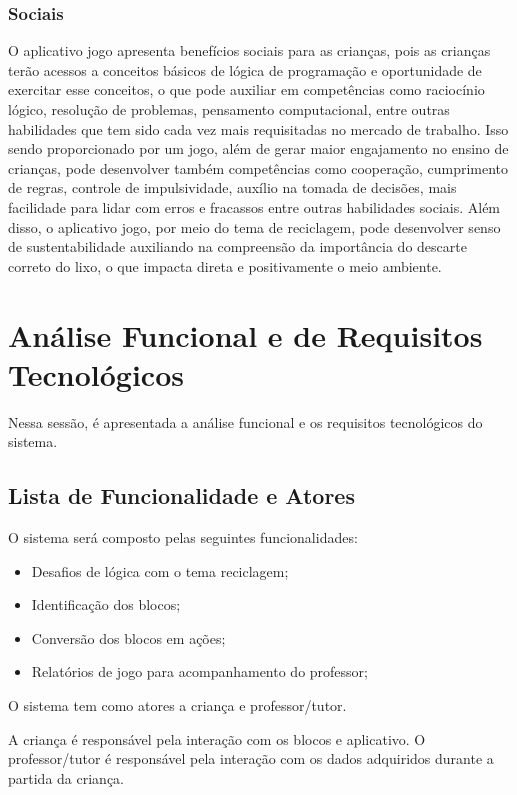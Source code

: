         \subsubsection{Sociais}
        O aplicativo jogo apresenta benefícios sociais para as crianças, pois as crianças terão acessos a conceitos básicos de lógica de programação e oportunidade de exercitar esse conceitos, o que pode auxiliar em competências como raciocínio lógico, resolução de problemas, pensamento computacional, entre outras habilidades que tem sido cada vez mais requisitadas no mercado de trabalho. Isso sendo proporcionado por um jogo, além de gerar maior engajamento no ensino de crianças, pode desenvolver  também competências como cooperação, cumprimento de regras, controle de impulsividade, auxílio na tomada de decisões, mais facilidade para lidar com erros e fracassos entre outras habilidades sociais.
        Além disso, o aplicativo jogo, por meio do tema de reciclagem, pode desenvolver senso de sustentabilidade auxiliando na compreensão da importância do descarte correto do lixo, o que impacta direta e positivamente  o meio ambiente.

\section{Análise Funcional e de Requisitos Tecnológicos}
    Nessa sessão, é apresentada a análise funcional e os requisitos tecnológicos do sistema.

    \subsection{Lista de Funcionalidade e Atores}
    O sistema será composto  pelas seguintes funcionalidades:
    \begin{itemize}
        \item Desafios de lógica com o tema reciclagem;
        \item Identificação dos blocos;
        \item Conversão dos blocos em ações;
        \item Relatórios de jogo para acompanhamento do professor;
    \end{itemize}
    
    O sistema tem como atores a criança e professor/tutor.
    
    A criança é responsável pela interação com os blocos e aplicativo.
    O professor/tutor é responsável pela interação com os dados adquiridos durante a partida da criança.
    
